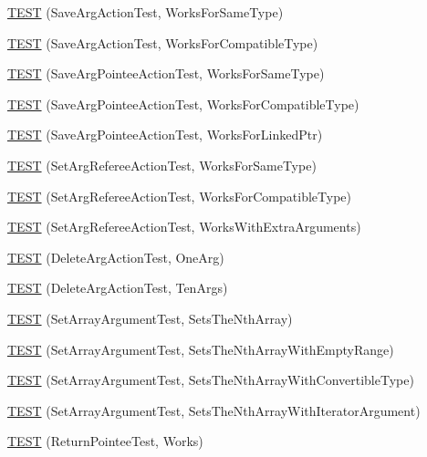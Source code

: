 \begin{DoxyCompactItemize}
\item 
\mbox{\hyperlink{namespacetesting_1_1gmock__more__actions__test_a511b9c6721629465fd1e2fbd65633ef9}{T\+E\+ST}} (Save\+Arg\+Action\+Test, Works\+For\+Same\+Type)
\item 
\mbox{\hyperlink{namespacetesting_1_1gmock__more__actions__test_a2b92b573de73fdf97dad4da8a67d7fc0}{T\+E\+ST}} (Save\+Arg\+Action\+Test, Works\+For\+Compatible\+Type)
\item 
\mbox{\hyperlink{namespacetesting_1_1gmock__more__actions__test_a51d471708cb6fa3c403ea1d936a49dc1}{T\+E\+ST}} (Save\+Arg\+Pointee\+Action\+Test, Works\+For\+Same\+Type)
\item 
\mbox{\hyperlink{namespacetesting_1_1gmock__more__actions__test_a35b74b32b6a222e048706e6ce8d64118}{T\+E\+ST}} (Save\+Arg\+Pointee\+Action\+Test, Works\+For\+Compatible\+Type)
\item 
\mbox{\hyperlink{namespacetesting_1_1gmock__more__actions__test_afc168d80fe8ca16f0efc874587574e64}{T\+E\+ST}} (Save\+Arg\+Pointee\+Action\+Test, Works\+For\+Linked\+Ptr)
\item 
\mbox{\hyperlink{namespacetesting_1_1gmock__more__actions__test_aa9fa575b30dca09e9886722b78415a22}{T\+E\+ST}} (Set\+Arg\+Referee\+Action\+Test, Works\+For\+Same\+Type)
\item 
\mbox{\hyperlink{namespacetesting_1_1gmock__more__actions__test_af5a15dbcba14010a5463f3ac9451ab8a}{T\+E\+ST}} (Set\+Arg\+Referee\+Action\+Test, Works\+For\+Compatible\+Type)
\item 
\mbox{\hyperlink{namespacetesting_1_1gmock__more__actions__test_a0ea4f3d8f1a643726e37825c58d8741f}{T\+E\+ST}} (Set\+Arg\+Referee\+Action\+Test, Works\+With\+Extra\+Arguments)
\item 
\mbox{\hyperlink{namespacetesting_1_1gmock__more__actions__test_a575e9a6f5bfcc133188e973147697425}{T\+E\+ST}} (Delete\+Arg\+Action\+Test, One\+Arg)
\item 
\mbox{\hyperlink{namespacetesting_1_1gmock__more__actions__test_a972b47a7e96b95606190afa928ea2db4}{T\+E\+ST}} (Delete\+Arg\+Action\+Test, Ten\+Args)
\item 
\mbox{\hyperlink{namespacetesting_1_1gmock__more__actions__test_aacf568e3d16b210aa2316ccc2cb6b22d}{T\+E\+ST}} (Set\+Array\+Argument\+Test, Sets\+The\+Nth\+Array)
\item 
\mbox{\hyperlink{namespacetesting_1_1gmock__more__actions__test_a63a338ef41086b80dba5729ecd1073e5}{T\+E\+ST}} (Set\+Array\+Argument\+Test, Sets\+The\+Nth\+Array\+With\+Empty\+Range)
\item 
\mbox{\hyperlink{namespacetesting_1_1gmock__more__actions__test_a42955fc99954c095f9d7ded3b92c091f}{T\+E\+ST}} (Set\+Array\+Argument\+Test, Sets\+The\+Nth\+Array\+With\+Convertible\+Type)
\item 
\mbox{\hyperlink{namespacetesting_1_1gmock__more__actions__test_a5db6a5413414f6d9bb8a24d1f07bf882}{T\+E\+ST}} (Set\+Array\+Argument\+Test, Sets\+The\+Nth\+Array\+With\+Iterator\+Argument)
\item 
\mbox{\hyperlink{namespacetesting_1_1gmock__more__actions__test_a690ef20bd9c281781eddcf99b18cff6c}{T\+E\+ST}} (Return\+Pointee\+Test, Works)
\end{DoxyCompactItemize}
